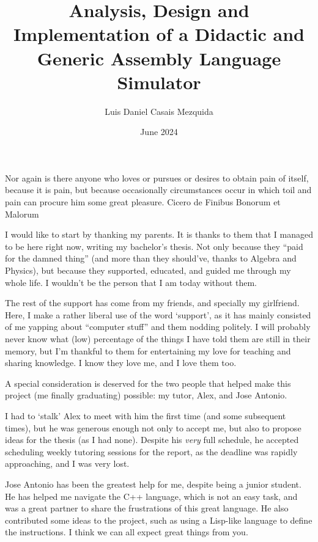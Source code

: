 \documentclass[en]{uc3mthesisIEEE}
\title{Analysis, Design and Implementation of a Didactic and Generic Assembly Language Simulator}
\author{Luis Daniel Casais Mezquida}
\date{June 2024}
\begin{document}
  \makecover


  \makeepigraph
    {
      Nor again is there anyone who loves or pursues or desires to obtain pain of itself, because it is pain, but because occasionally circumstances occur in which toil and pain can procure him some great pleasure.
    }  %
    {Cicero}  %
    {de Finibus Bonorum et Malorum}  %


  \begin{acknowledgements}
    I would like to start by thanking my parents. It is thanks to them that I managed to be here right now, writing my bachelor's thesis. Not only because they ``paid for the damned thing'' (and more than they should've, thanks to Algebra and Physics), but because they supported, educated, and guided me through my whole life. I wouldn't be the person that I am today without them.

    The rest of the support has come from my friends, and specially my girlfriend. Here, I make a rather liberal use of the word `support', as it has mainly consisted of me yapping about ``computer stuff'' and them nodding politely. I will probably never know what (low) percentage of the things I have told them are still in their memory, but I'm thankful to them for entertaining my love for teaching and sharing knowledge. I know they love me, and I love them too.

    A special consideration is deserved for the two people that helped make this project (me finally graduating) possible: my tutor, Alex, and Jose Antonio.

    I had to `stalk' Alex to meet with him the first time (and some subsequent times), but he was generous enough not only to accept me, but also to propose ideas for the thesis (as I had none). Despite his \textit{very} full schedule, he accepted scheduling weekly tutoring sessions for the report, as the deadline was rapidly approaching, and I was very lost.

    Jose Antonio has been the greatest help for me, despite being a junior student. He has helped me navigate the C++ language, which is not an easy task, and was a great partner to share the frustrations of this great language. He also contributed some ideas to the project, such as using a Lisp-like language to define the instructions. I think we can all expect great things from you.


\end{acknowledgements}
\end{document}
